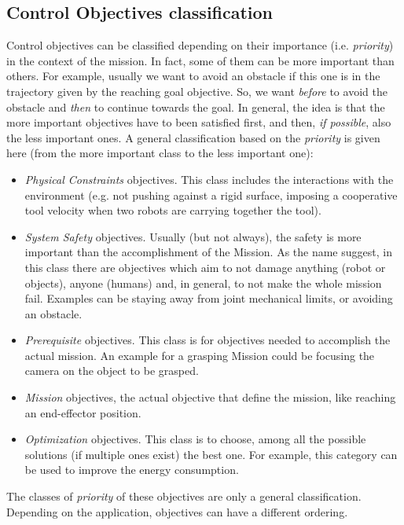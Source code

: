 \subsection{Control Objectives classification}
\label{sec:coClass}
Control objectives can be classified depending on their importance (i.e. \textit{priority}) in the context of the mission. In fact, some of them can be more important than others. For example, usually we want to avoid an obstacle if this one is in the trajectory given by the reaching goal objective. So, we want \textit{before} to avoid the obstacle and \textit{then} to continue towards the goal. In general, the idea is that the more important objectives have to been satisfied first, and then, \textit{if possible}, also the less important ones. 
A general classification based on the \textit{priority} is given here (from the more important class to the less important one):
\begin{itemize}
	\item \textit{Physical Constraints} objectives. This class includes the interactions with the environment (e.g. not pushing against a rigid surface, imposing a cooperative tool velocity when two robots are carrying together the tool).
	\item \textit{System Safety} objectives. Usually (but not always), the safety is more important than the accomplishment of the Mission. As the name suggest, in this class there are objectives which aim to not damage anything (robot or objects), anyone (humans) and, in general, to not make the whole mission fail. Examples can be staying away from joint mechanical limits, or avoiding an obstacle.
	\item \textit{Prerequisite} objectives. This class is for objectives needed to accomplish the actual mission. An example for a grasping Mission could be focusing the camera on the object to be grasped.
	\item \textit{Mission} objectives, the actual objective that define the mission, like reaching an end-effector position.
	\item \textit{Optimization} objectives. This class is to choose, among all the possible solutions (if multiple ones exist) the best one. For example, this category can be used to improve the energy consumption.
\end{itemize}
The classes of \textit{priority} of these objectives are only a general classification. Depending on the application, objectives can have a different ordering.


